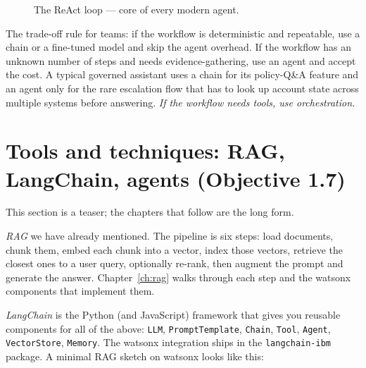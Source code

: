 \begin{figure}[h]
\centering
{}
\caption{The ReAct loop --- core of every modern agent.}
\label{fig:react-loop}
\end{figure}

The trade-off rule for teams: if the workflow is deterministic and repeatable, use a chain or a fine-tuned model and skip the agent overhead. If the workflow has an unknown number of steps and needs evidence-gathering, use an agent and accept the cost. A typical governed assistant uses a chain for its policy-Q\&A feature and an agent only for the rare escalation flow that has to look up account state across multiple systems before answering. \emph{If the workflow needs tools, use orchestration.}

\section{Tools and techniques: RAG, LangChain, agents (Objective 1.7)}

This section is a teaser; the chapters that follow are the long form.

\emph{RAG} we have already mentioned. The pipeline is six steps: load documents, chunk them, embed each chunk into a vector, index those vectors, retrieve the closest ones to a user query, optionally re-rank, then augment the prompt and generate the answer. Chapter~\ref{ch:rag} walks through each step and the watsonx components that implement them.

\emph{LangChain} is the Python (and JavaScript) framework that gives you reusable components for all of the above: \texttt{LLM}, \texttt{PromptTemplate}, \texttt{Chain}, \texttt{Tool}, \texttt{Agent}, \texttt{VectorStore}, \texttt{Memory}. The watsonx integration ships in the \texttt{langchain-ibm} package. A minimal RAG sketch on watsonx looks like this:

